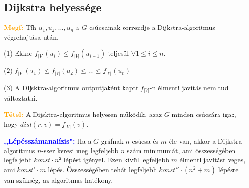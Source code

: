 \documentclass[../szamtud.tex]{subfiles}
\begin{document}
		\subsection{Dijkstra helyessége}
				
			\textcolor{orange}{\textbf{Megf:}} Tfh $u_1, u_2, \dots, u_n$ a $G$ csúcsainak sorrendje a Dijkstra-algoritmus végrehajtása után. 

			(1) Ekkor $f_{|V|}(u_i) \leq f_{|V|}(u_{i+1})$ teljesül $\forall 1 \leq i \leq n$.


			(2) $f_{|V|}(u_1) \leq f_{|V|}(u_2) \leq \dots \leq f_{|V|}(u_n)$

			(3) A Dijsktra-algoritmus outputjaként kaptt $f_{|V|}$-n élmenti javítás nem tud változtatni.
 

			\textcolor{orange}{\textbf{Tétel:}} A Dijsktra-algoritmus helyesen működik, azaz $G$ minden csúcsára igaz, hogy $dist(r,v) = f_{|V|}(v)$.


			\textbf{\textcolor{blue}{,,Lépésszámanalízis":}} Ha a $G$ gráfnak $n$ csúcsa és $m$ éle van, akkor a Dijkstra-algoritmus $n$-szer keresi meg legfeljebb $n$ szám minimumát, ami összességében legfeljebb $konst \cdot n^2$ lépést igényel. Ezen kívül legfeljebb $m$ élmenti javítást véges, ami $konst' \cdot m$ lépés. Összességében tehát legfeljebb $konst'' \cdot (n^2 + m)$ lépésre van szükség, az algoritmus hatékony. 
\end{document}
